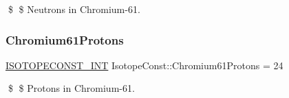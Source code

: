 \$ \$ Neutrons in Chromium-\/61. \mbox{\label{group___isotope_const-_chromium-_cr61_ga5e3f298826a9eddc371230cdcef7cc95}} 
\subsubsection{\texorpdfstring{Chromium61\+Protons}{Chromium61Protons}}
{\footnotesize\ttfamily \mbox{\hyperlink{group___isotope_const-_macros_ga5f18360b3e99483a35c32d789e62621c}{I\+S\+O\+T\+O\+P\+E\+C\+O\+N\+S\+T\+\_\+\+I\+NT}} Isotope\+Const\+::\+Chromium61\+Protons = 24}

\$ \$ Protons in Chromium-\/61. 